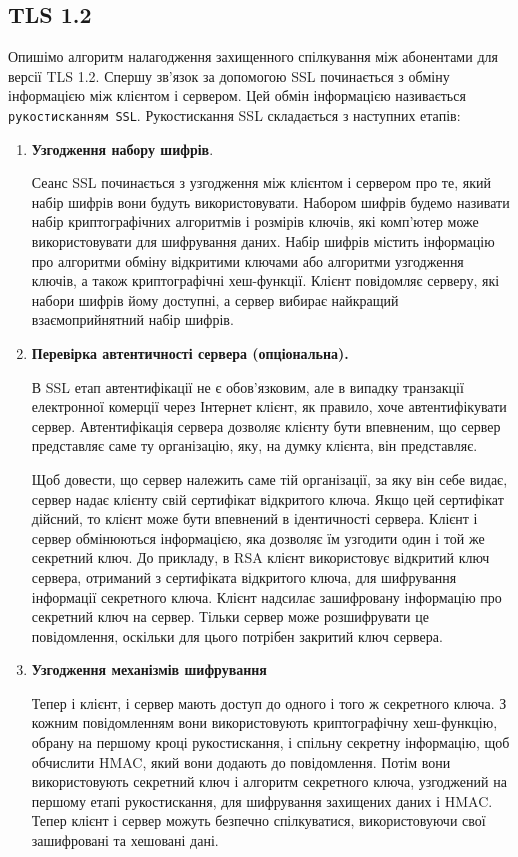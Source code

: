 \subsection{TLS 1.2}
Опишімо алгоритм налагодження захищенного спілкування між абонентами для версії TLS 1.2.
Спершу зв'язок за допомогою SSL починається з обміну інформацією між клієнтом і сервером. Цей обмін інформацією називається \texttt{рукостисканням SSL}. Рукостискання SSL складається з наступних етапів:
\begin{enumerate}
    \item \textbf{Узгодження набору шифрів}.
    
    Сеанс SSL починається з узгодження між клієнтом і сервером про те, який набір шифрів вони будуть використовувати. Набором шифрів будемо називати набір криптографічних алгоритмів і розмірів ключів, які комп'ютер може використовувати для шифрування даних. Набір шифрів містить інформацію про алгоритми обміну відкритими ключами або алгоритми узгодження ключів, а також криптографічні хеш-функції. Клієнт повідомляє серверу, які набори шифрів йому доступні, а сервер вибирає найкращий взаємоприйнятний набір шифрів.
    
    \item \textbf{Перевірка автентичності сервера (опціональна).}
    
    В SSL етап автентифікації не є обов'язковим, але в випадку транзакції електронної комерції через Інтернет клієнт, як правило, хоче автентифікувати сервер. Автентифікація сервера дозволяє клієнту бути впевненим, що сервер представляє саме ту організацію, яку, на думку клієнта, він представляє.
    
    Щоб довести, що сервер належить саме тій організації, за яку він себе видає, сервер надає клієнту свій сертифікат відкритого ключа. Якщо цей сертифікат дійсний, то клієнт може бути впевнений в ідентичності сервера.
    Клієнт і сервер обмінюються інформацією, яка дозволяє їм узгодити один і той же секретний ключ. До прикладу, в RSA клієнт використовує відкритий ключ сервера, отриманий з сертифіката відкритого ключа, для шифрування інформації секретного ключа. Клієнт надсилає зашифровану інформацію про секретний ключ на сервер. Тільки сервер може розшифрувати це повідомлення, оскільки для цього потрібен закритий ключ сервера.
    
    \item \textbf{Узгодження механізмів шифрування}
    
    Тепер і клієнт, і сервер мають доступ до одного і того ж секретного ключа. З кожним повідомленням вони використовують криптографічну хеш-функцію, обрану на першому кроці рукостискання, і спільну секретну інформацію, щоб обчислити HMAC, який вони додають до повідомлення. Потім вони використовують секретний ключ і алгоритм секретного ключа, узгоджений на першому етапі рукостискання, для шифрування захищених даних і HMAC. Тепер клієнт і сервер можуть безпечно спілкуватися, використовуючи свої зашифровані та хешовані дані.
\end{enumerate}
